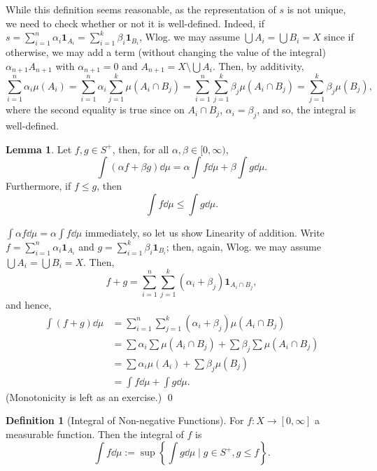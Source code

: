\documentclass[
]{article}
\theoremstyle{definition}
\theoremstyle{definition}
\newtheorem{definition}{Definition}[section]
\newtheorem{lemma}{Lemma}[section]
\begin{document}
While this definition seems reasonable, as the representation of \(s\)
is not unique, we need to check whether or not it is well-defined.
Indeed, if
\(s = \sum_{i = 1}^n \alpha_i \mathbf{1}_{A_i} = \sum_{i = 1}^k \beta_i \mathbf{1}_{B_i}\),
Wlog. we may assume \(\bigcup A_i = \bigcup B_i = X\) since if
otherwise, we may add a term (without changing the value of the
integral) \(\alpha_{n + 1} A_{n + 1}\) with \(\alpha_{n + 1} = 0\) and
\(A_{n + 1} = X \setminus \bigcup A_i\). Then, by additivity,
\[\sum_{i = 1}^n\alpha_i \mu(A_i) = \sum_{i = 1}^n \alpha_i \sum_{j = 1}^k \mu(A_i \cap B_j) 
= \sum_{i = 1}^n \sum_{j = 1}^k \beta_j \mu(A_i \cap B_j) = \sum_{j = 1}^k \beta_j \mu(B_j),\]
where the second equality is true since on \(A_i \cap B_j\),
\(\alpha_i = \beta_j\), and so, the integral is well-defined.

\begin{lemma}
  Let \(f, g \in S^+\), then, for all \(\alpha, \beta \in [0, \infty)\), 
  \[\int (\alpha f + \beta g) \dd \mu = \alpha \int f \dd \mu + \beta \int g \dd \mu.\]
  Furthermore, if \(f \le g\), then 
  \[\int f \dd \mu \le \int g \dd \mu.\]
\end{lemma}
\proof

\(\int \alpha f \dd \mu = \alpha \int f \dd \mu\) immediately, so let us
show Linearity of addition. Write
\(f = \sum_{i = 1}^n \alpha_i \mathbf{1}_{A_i}\) and
\(g = \sum_{i = 1}^k \beta_i \mathbf{1}_{B_i}\); then, again, Wlog. we
may assume \(\bigcup A_i = \bigcup B_i = X\). Then,
\[f + g = \sum_{i = 1}^n \sum_{j = 1}^k (\alpha_i + \beta_j) \mathbf{1}_{A_i \cap B_j},\]
and hence, \[\begin{split}
    \int (f + g) \dd \mu 
      & = \sum_{i = 1}^n \sum_{j = 1}^k (\alpha_i + \beta_j) \mu(A_i \cap B_j)\\
      & = \sum \alpha_i \sum \mu(A_i \cap B_j) + \sum \beta_j \sum \mu(A_i \cap B_j)\\
      & = \sum \alpha_i \mu(A_i) + \sum \beta_j \mu(B_j)\\
      & = \int f \dd \mu + \int g \dd \mu.
  \end{split}\] (Monotonicity is left as an exercise.) \qed

\begin{definition}[Integral of Non-negative Functions]
  For \(f : X \to [0, \infty]\) a measurable function. Then the integral 
  of \(f\) is 
  \[\int f \dd \mu := \sup \left\{\int g \dd \mu \mid g \in S^+, g \le f\right\}.\]
\end{definition}
\end{document}
